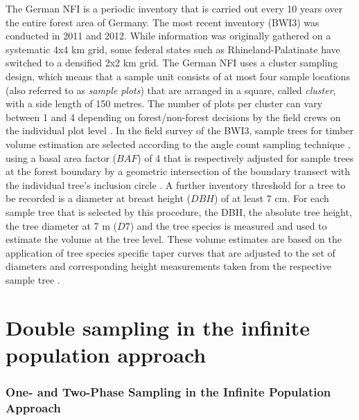 \documentclass[remotesensing,article,submit,moreauthors,pdftex,10pt,a4paper]{mdpi}
\begin{document}
The German NFI is a periodic inventory that is carried out every 10 years over the entire forest area of Germany. The most recent inventory (BWI3) was conducted in 2011 and 2012. While information was originally gathered on a systematic 4x4 km grid, some federal states such as Rhineland-Palatinate have switched to a densified 2x2 km grid. The German NFI uses a cluster sampling design, which means that a sample unit consists of at most four sample locations (also referred to as \textit{sample plots}) that are arranged in a square, called \textit{cluster}, with a side length of 150 metres. The number of plots per cluster can vary between 1 and 4 depending on forest/non-forest decisions by the field crews on the individual plot level \citep{bwi3_aufn}. In the field survey of the BWI3, sample trees for timber volume estimation are selected according to the angle count sampling technique \citep{bitterlich1984}, using a basal area factor ($BAF$) of 4 that is respectively adjusted for sample trees at the forest boundary by a geometric intersection of the boundary transect with the individual tree's inclusion circle \citep{bwi3_aufn}. A further inventory threshold for a tree to be recorded is a diameter at breast height ($DBH$) of at least 7 cm. For each sample tree that is selected by this procedure, the DBH, the absolute tree height, the tree diameter at 7 m ($D7$) and the tree species is measured and used to estimate the volume at the tree level. These volume estimates are based on the application of tree species specific taper curves that are adjusted to the set of diameters and corresponding height measurements taken from the respective sample tree \citep{kublin2013}.


\section{Double sampling in the infinite population approach}
\label{sec:inf_pop}

 \subsubsection{One- and Two-Phase Sampling in the Infinite Population Approach}
\end{document}
